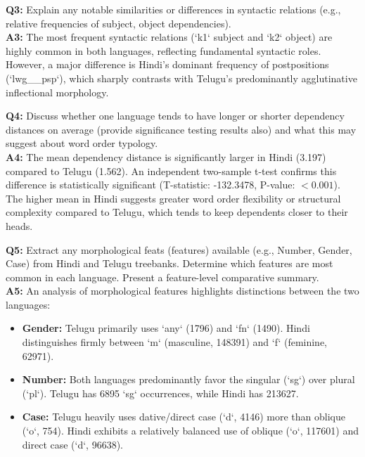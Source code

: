 \documentclass{article}
\begin{document}
\vspace{0.5cm}
\noindent\textbf{Q3:} Explain any notable similarities or differences in syntactic relations (e.g., relative frequencies of subject, object dependencies).\\
\textbf{A3:} The most frequent syntactic relations (`k1` subject and `k2` object) are highly common in both languages, reflecting fundamental syntactic roles. However, a major difference is Hindi's dominant frequency of postpositions (`lwg\_\_psp`), which sharply contrasts with Telugu's predominantly agglutinative inflectional morphology.

\vspace{0.5cm}
\noindent\textbf{Q4:} Discuss whether one language tends to have longer or shorter dependency distances on average (provide significance testing results also) and what this may suggest about word order typology.\\
\textbf{A4:} The mean dependency distance is significantly larger in Hindi (3.197) compared to Telugu (1.562). An independent two-sample t-test confirms this difference is statistically significant (T-statistic: -132.3478, P-value: $< 0.001$). The higher mean in Hindi suggests greater word order flexibility or structural complexity compared to Telugu, which tends to keep dependents closer to their heads.

\vspace{0.5cm}
\noindent\textbf{Q5:} Extract any morphological feats (features) available (e.g., Number, Gender, Case) from Hindi and Telugu treebanks. Determine which features are most common in each language. Present a feature-level comparative summary.\\
\textbf{A5:} An analysis of morphological features highlights distinctions between the two languages:
\begin{itemize}
    \item \textbf{Gender:} Telugu primarily uses `any` (1796) and `fn` (1490). Hindi distinguishes firmly between `m` (masculine, 148391) and `f` (feminine, 62971).
    \item \textbf{Number:} Both languages predominantly favor the singular (`sg`) over plural (`pl`). Telugu has 6895 `sg` occurrences, while Hindi has 213627.
    \item \textbf{Case:} Telugu heavily uses dative/direct case (`d`, 4146) more than oblique (`o`, 754). Hindi exhibits a relatively balanced use of oblique (`o`, 117601) and direct case (`d`, 96638).
\end{itemize}
\end{document}

